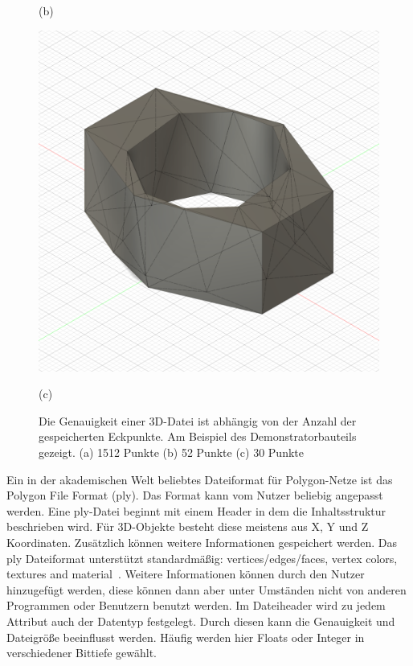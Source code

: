 \begin{figure}[H]
\begin{minipage}{0.32\textwidth}
        \caption*{(b)}
    \end{minipage}\hfill
    \begin{minipage}{0.32\textwidth}
        \centering
        \includegraphics[width=\linewidth]{images/image_demo_low.PNG} %
        \caption*{(c)}
    \end{minipage}\hfill

    \caption{Die Genauigkeit einer 3D-Datei ist abhängig von der Anzahl der gespeicherten
    Eckpunkte. Am Beispiel des Demonstratorbauteils gezeigt. (a) 1512 Punkte
    (b) 52 Punkte (c) 30 Punkte}
    \label{fig:3d_design}
\end{figure}

Ein in der akademischen Welt beliebtes Dateiformat für Polygon-Netze ist das 
Polygon File Format (ply).
Das Format kann vom Nutzer beliebig angepasst werden. Eine ply-Datei beginnt mit 
einem Header in dem die Inhaltsstruktur beschrieben wird. 
Für 3D-Objekte besteht diese meistens aus X, Y und Z Koordinaten. 
Zusätzlich können weitere Informationen gespeichert werden. Das ply Dateiformat 
unterstützt standardmäßig: \glqq vertices/edges/faces, vertex colors, textures and
material\grqq ~\cite{KentonMchenry.2008}. Weitere Informationen können durch den Nutzer 
hinzugefügt werden, 
diese können dann aber unter Umständen nicht von anderen Programmen oder Benutzern
benutzt werden.
Im Dateiheader wird zu jedem Attribut auch der Datentyp festgelegt. Durch diesen 
kann die Genauigkeit und Dateigröße beeinflusst werden. Häufig werden hier Floats oder
Integer in verschiedener Bittiefe gewählt.


